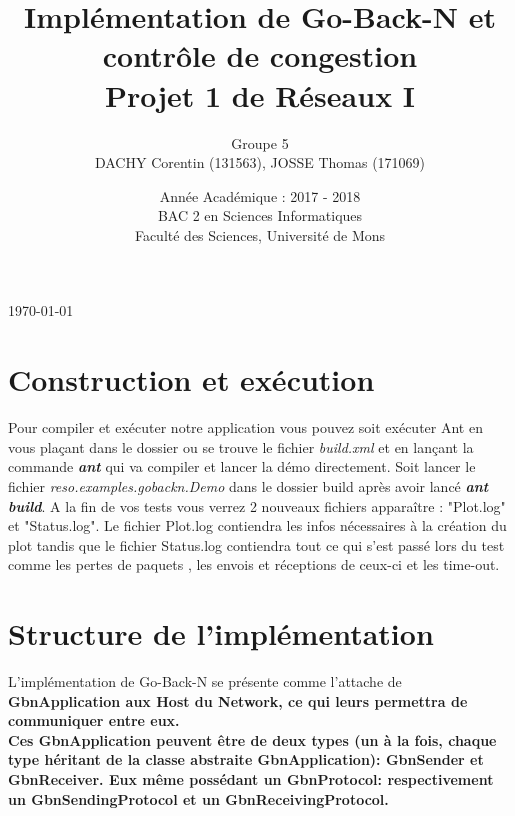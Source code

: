 \documentclass[11pt]{article}
\begin{document}
\title{ \huge
  Implémentation de Go-Back-N et contrôle de congestion \\
  \Large Projet 1 de Réseaux I \\}

\author{Groupe 5\\DACHY Corentin (131563), JOSSE Thomas (171069)}

\date{Année Académique : 2017 - 2018\\
BAC 2 en Sciences Informatiques\\
\vspace{1cm}
Faculté des Sciences, Université de Mons}

\maketitle

\bigskip
\begin{center} \today \end{center}

\newpage

\section{Construction et exécution}
Pour compiler et exécuter notre application vous pouvez soit exécuter Ant en vous plaçant dans le dossier ou se trouve le fichier \textit{build.xml} et en lançant la commande \textbf{\textit{ant}} qui va compiler et lancer la démo directement. Soit lancer le fichier \textit{reso.examples.gobackn.Demo} dans le dossier build après avoir lancé \textbf{\textit{ant build}}. A la fin de vos tests vous verrez 2 nouveaux fichiers apparaître : "Plot.log" et "Status.log". Le fichier Plot.log contiendra les infos nécessaires à la création du plot tandis que le fichier Status.log contiendra tout ce qui s'est passé lors du test comme les pertes de paquets , les envois et réceptions de ceux-ci et les time-out.
\section{Structure de l'implémentation}

L'implémentation de Go-Back-N se présente comme l'attache de \bfseries GbnApplication \mdseries aux Host du Network, ce qui leurs permettra de communiquer entre eux. \\
Ces GbnApplication peuvent être de deux types (un à la fois, chaque type héritant de la classe abstraite GbnApplication): \bfseries GbnSender \mdseries  et \bfseries GbnReceiver\mdseries. Eux même possédant un \bfseries GbnProtocol\mdseries : respectivement un \bfseries GbnSendingProtocol \mdseries et un \bfseries GbnReceivingProtocol\mdseries .
\end{document}
